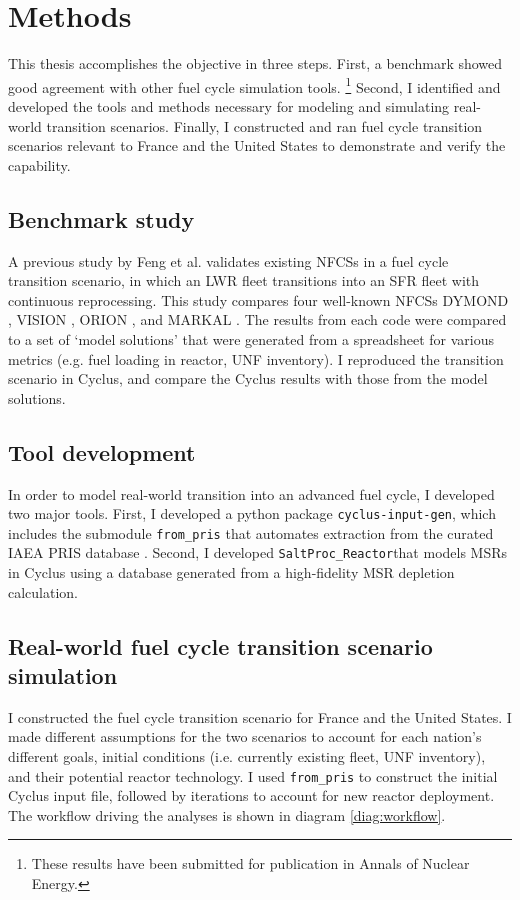 \section{Methods}
This thesis accomplishes the objective in three steps. 
First, a benchmark showed good agreement with other
fuel cycle simulation tools. \footnote{These results have been
submitted for publication in Annals of Nuclear Energy.}
Second, I identified and developed the tools and methods necessary
for modeling and simulating real-world transition scenarios.
Finally, I constructed and ran fuel cycle transition scenarios
relevant to France and the United States to demonstrate
and verify the capability.

\subsection{Benchmark study}
A previous study by Feng et al. \cite{feng_standardized_2016} validates existing 
\glspl{NFCS} in a fuel cycle transition scenario, in which an \gls{LWR} fleet
transitions into an \gls{SFR} fleet with continuous reprocessing. This 
study compares four well-known \glspl{NFCS}
DYMOND \cite{yacout_modeling_2005},
VISION \cite{jacobson_verifiable_2010},
ORION \cite{gregg_analysis_2012}, and
MARKAL \cite{shay_epa_2006}. The results from each code were
compared to a set of `model solutions' that were generated
from a spreadsheet for various metrics (e.g. fuel loading
in reactor, \gls{UNF} inventory). I reproduced the transition
scenario in Cyclus, and compare the Cyclus results with those
from the model solutions.

\subsection{Tool development}
In order to model real-world transition into an advanced
fuel cycle, I developed two major tools. First, I developed a python package \texttt{cyclus-input-gen},
which includes the submodule \texttt{from\_pris}
that automates extraction from the curated \gls{IAEA} \gls{PRIS} database
\cite{iaea_nuclear_2018}. Second, I developed \texttt{SaltProc\_Reactor}that models \glspl{MSR}
in Cyclus using a database generated from a high-fidelity \gls{MSR} depletion calculation.

\subsection{Real-world fuel cycle transition scenario simulation}
I constructed the fuel cycle transition scenario for France and the United States.
I made different assumptions for the two scenarios to account for each nation's different goals,
initial conditions (i.e. currently existing fleet, \gls{UNF} inventory), and their potential reactor
technology. I used \texttt{from\_pris} to construct the initial Cyclus input file,
followed by iterations to account for new reactor deployment. The workflow driving the analyses is shown in diagram \ref{diag:workflow}.


